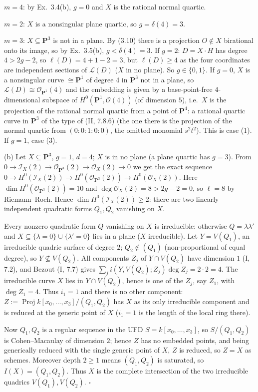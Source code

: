 \documentclass[11pt]{article}
\begin{document}
$m=4$: by Ex.~3.4(b), $g=0$ and $X$ is the rational normal quartic.

$m=2$: $X$ is a nonsingular plane quartic, so $g=\delta(4)=3$.

$m=3$: $X\subseteq\mathbf P^3$ is not in a plane. By (3.10) there is a projection $O\notin X$ birational onto its image, so by Ex.~3.5(b), $g<\delta(4)=3$. If $g=2$: $D=X\cdot H$ has degree $4>2g-2$, so $\ell(D)=4+1-2=3$, but $\ell(D)\ge4$ as the four coordinates are independent sections of $\mathcal L(D)$ ($X$ in no plane). So $g\in\{0,1\}$. If $g=0$, $X$ is a nonsingular curve $\cong\mathbf P^1$ of degree $4$ in $\mathbf P^3$ not in a plane, so $\mathcal L(D)\cong\mathcal O_{\mathbf P^1}(4)$ and the embedding is given by a base-point-free $4$-dimensional subspace of $H^0(\mathbf P^1,\mathcal O(4))$ (of dimension $5$), i.e.\ $X$ is the projection of the rational normal quartic from a point of $\mathbf P^4$: a rational quartic curve in $\mathbf P^3$ of the type of (II, 7.8.6) (the one there is the projection of the normal quartic from $(0:0:1:0:0)$, the omitted monomial $s^2t^2$). This is case (1). If $g=1$, case (3).

(b) Let $X\subseteq\mathbf P^3$, $g=1$, $d=4$; $X$ is in no plane (a plane quartic has $g=3$). From $0\to\mathcal I_X(2)\to\mathcal O_{\mathbf P^3}(2)\to\mathcal O_X(2)\to0$ we get the exact sequence $0\to H^0(\mathcal I_X(2))\to H^0(\mathcal O_{\mathbf P^3}(2))\to H^0(\mathcal O_X(2))$. Here $\dim H^0(\mathcal O_{\mathbf P^3}(2))=10$ and $\deg\mathcal O_X(2)=8>2g-2=0$, so $\ell=8$ by Riemann--Roch. Hence $\dim H^0(\mathcal I_X(2))\ge2$: there are two linearly independent quadratic forms $Q_1,Q_2$ vanishing on $X$.

Every nonzero quadratic form $Q$ vanishing on $X$ is irreducible: otherwise $Q=\lambda\lambda'$ and $X\subseteq\{\lambda=0\}\cup\{\lambda'=0\}$ lies in a plane ($X$ irreducible). Let $Y=V(Q_1)$, an irreducible quadric surface of degree $2$; $Q_2\notin(Q_1)$ (non-proportional of equal degree), so $Y\not\subseteq V(Q_2)$. All components $Z_j$ of $Y\cap V(Q_2)$ have dimension $1$ (I, 7.2), and Bezout (I, 7.7) gives $\sum_j i(Y,V(Q_2);Z_j)\deg Z_j=2\cdot2=4$. The irreducible curve $X$ lies in $Y\cap V(Q_2)$, hence is one of the $Z_j$, say $Z_1$, with $\deg Z_1=4$. Thus $i_1=1$ and there is no other component: $Z:=\operatorname{Proj}k[x_0,\dots,x_3]/(Q_1,Q_2)$ has $X$ as its only irreducible component and is reduced at the generic point of $X$ ($i_1=1$ is the length of the local ring there).

Now $Q_1,Q_2$ is a regular sequence in the UFD $S=k[x_0,\dots,x_3]$, so $S/(Q_1,Q_2)$ is Cohen--Macaulay of dimension $2$; hence $Z$ has no embedded points, and being generically reduced with the single generic point of $X$, $Z$ is reduced, so $Z=X$ as schemes. Moreover depth $2\ge1$ means $(Q_1,Q_2)$ is saturated, so $I(X)=(Q_1,Q_2)$. Thus $X$ is the complete intersection of the two irreducible quadrics $V(Q_1),V(Q_2)$. \hfill$\square$
\end{document}
